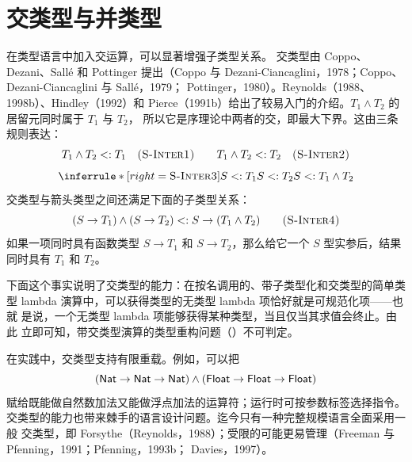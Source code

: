 \section{交类型与并类型}
\label{sec:15.7}

在类型语言中加入交运算，可以显著增强子类型关系。
交类型由 Coppo、Dezani、Sall\'e 和 Pottinger 提出（Coppo 与
Dezani-Ciancaglini，1978；Coppo、Dezani-Ciancaglini 与 Sall\'e，1979；
Pottinger，1980）。Reynolds（1988、1998b）、Hindley（1992）和
Pierce（1991b）给出了较易入门的介绍。\(T_1\wedge T_2\) 的居留元同时属于 \(T_1\) 与 \(T_2\)，
所以它是序理论中两者的交，即最大下界。这由三条规则表达：
\[
T_1\wedge T_2\mathrel{<:} T_1
\quad\textsc{(S-Inter1)}
\qquad
T_1\wedge T_2\mathrel{<:} T_2
\quad\textsc{(S-Inter2)}
\]
\[
\inferrule*[right=\textsc{S-Inter3}]
 {S\subtype T_1\\S\subtype T_2}
 {S\subtype T_1\wedge T_2}
\]
交类型与箭头类型之间还满足下面的子类型关系：
\[
(S\to T_1)\wedge(S\to T_2)\mathrel{<:} S\to(T_1\wedge T_2)
\qquad\textsc{(S-Inter4)}
\]
如果一项同时具有函数类型 \(S\to T_1\) 和 \(S\to T_2\)，那么给它一个
\(S\) 型实参后，结果同时具有 \(T_1\) 和 \(T_2\)。

下面这个事实说明了交类型的能力：在按名调用的、带子类型化和交类型的简单类型
lambda 演算中，可以获得类型的无类型 lambda 项恰好就是可规范化项——也就
是说，一个无类型 lambda 项能够获得某种类型，当且仅当其求值会终止。由此
立即可知，带交类型演算的类型重构问题（）不可判定。


在实践中，交类型支持有限重载。例如，可以把
\[
(\mathsf{Nat}\to\mathsf{Nat}\to\mathsf{Nat})
\wedge
(\mathsf{Float}\to\mathsf{Float}\to\mathsf{Float})
\]
赋给既能做自然数加法又能做浮点加法的运算符；运行时可按参数标签选择指令。
交类型的能力也带来棘手的语言设计问题。迄今只有一种完整规模语言全面采用一般
交类型，即 Forsythe（Reynolds，1988）；受限的可能更易管理（Freeman 与 Pfenning，1991；Pfenning，1993b；
Davies，1997）。

